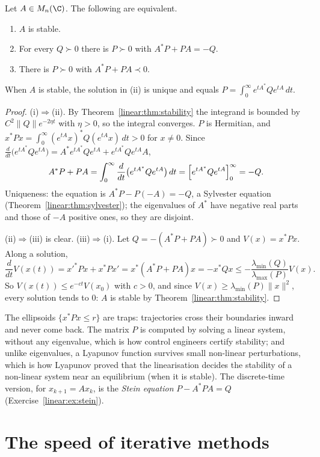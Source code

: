 \begin{theorem}[Lyapunov, 1892]\label{linear:thm:lyapunov}
Let $A\in M_n(\C)$. The following are equivalent.
\begin{enumerate}[label=(\roman*)]
\item $A$ is stable.
\item For every $Q\succ0$ there is $P\succ0$ with $A^*P+PA=-Q$.
\item There is $P\succ0$ with $A^*P+PA\prec0$.
\end{enumerate}
When $A$ is stable, the solution in (ii) is unique and equals $P=\int_0^\infty e^{tA^*}Qe^{tA}\,dt$.
\end{theorem}
\begin{proof}
(i)$\Rightarrow$(ii). By Theorem~\ref{linear:thm:stability} the integrand is bounded by $C^2\|Q\|e^{-2\eta t}$ with $\eta>0$, so the integral
converges. $P$ is Hermitian, and $x^*Px=\int_0^\infty(e^{tA}x)^*Q(e^{tA}x)\,dt>0$ for $x\ne0$. Since $\frac d{dt}\bigl(e^{tA^*}Qe^{tA}\bigr)=
A^*e^{tA^*}Qe^{tA}+e^{tA^*}Qe^{tA}A$,
\[
A^*P+PA=\int_0^\infty\frac d{dt}\bigl(e^{tA^*}Qe^{tA}\bigr)\,dt=\Bigl[e^{tA^*}Qe^{tA}\Bigr]_0^\infty=-Q.
\]
Uniqueness: the equation is $A^*P-P(-A)=-Q$, a Sylvester equation (Theorem~\ref{linear:thm:sylvester}); the eigenvalues of $A^*$ have negative
real parts and those of $-A$ positive ones, so they are disjoint.

(ii)$\Rightarrow$(iii) is clear. (iii)$\Rightarrow$(i). Let $Q=-(A^*P+PA)\succ0$ and $V(x)=x^*Px$. Along a solution,
\[
\frac d{dt}V(x(t))=x'^*Px+x^*Px'=x^*(A^*P+PA)x=-x^*Qx\le-\frac{\lambda_{\min}(Q)}{\lambda_{\max}(P)}V(x).
\]
So $V(x(t))\le e^{-ct}V(x_0)$ with $c>0$, and since $V(x)\ge\lambda_{\min}(P)\|x\|^2$, every solution tends to $0$: $A$ is stable by
Theorem~\ref{linear:thm:stability}.
\end{proof}

The ellipsoids $\{x^*Px\le r\}$ are traps: trajectories cross their boundaries inward and never come back. The matrix $P$ is computed
by solving a linear system, without any eigenvalue, which is how control engineers certify stability; and unlike eigenvalues, a
Lyapunov function survives small non-linear perturbations, which is how Lyapunov proved that the linearisation decides the stability
of a non-linear system near an equilibrium (when it is stable). The discrete-time version, for $x_{k+1}=Ax_k$, is the \emph{Stein
equation} $P-A^*PA=Q$ (Exercise~\ref{linear:ex:stein}).

\section{The speed of iterative methods}

